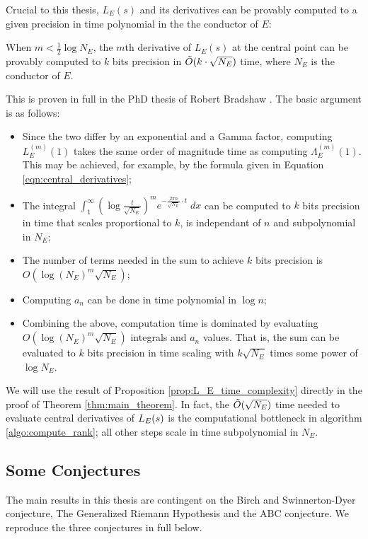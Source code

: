 Crucial to this thesis, $L_E(s)$ and its derivatives can be provably computed to a given precision in time polynomial in the the conductor of $E$:
\begin{proposition}\label{prop:L_E_time_complexity}
When $m<\frac{1}{2} \log N_E$, the $m$th derivative of $L_E(s)$ at the central point can be provably computed to $k$ bits precision in $\tilde{O}(k\cdot \sqrt{N_E})$ time, where $N_E$ is the conductor of $E$.
\end{proposition}
This is proven in full in the PhD thesis of Robert Bradshaw \cite{Bra-2010}. The basic argument is as follows:
\begin{itemize}
\item Since the two differ by an exponential and a Gamma factor, computing $L_E^{(m)}(1)$ takes the same order of magnitude time as computing $\Lambda_E^{(m)}(1)$. This may be achieved, for example, by the formula given in Equation \ref{eqn:central_derivatives};
\item The integral $\int_{1}^{\infty} \left(\log \frac{t}{\sqrt{N_E}}\right)^m e^{-\frac{2\pi n}{\sqrt{N_E}}\cdot t} \; dx$ can be computed to $k$ bits precision in time that scales proportional to $k$, is independant of $n$ and subpolynomial in $N_E$;
\item The number of terms needed in the sum to achieve $k$ bits precision is $O\left( \log(N_E)^m\sqrt{N_E}\right)$;
\item Computing $a_n$ can be done in time polynomial in $\log n$;
\item Combining the above, computation time is dominated by evaluating $O( \log(N_E)^m\sqrt{N_E})$ integrals and $a_n$ values. That is, the sum can be evaluated to $k$ bits precision in time scaling with $k \sqrt{N_E}$ times some power of $\log N_E$.
\end{itemize}
We will use the result of Proposition \ref{prop:L_E_time_complexity} directly in the proof of Theorem \ref{thm:main_theorem}. In fact, the $\tilde{O}(\sqrt{N_E})$ time needed to evaluate central derivatives of $L_E(s)$ is the computational bottleneck in algorithm \ref{algo:compute_rank}; all other steps scale in time subpolynomial in $N_E$. 

\subsection{Some Conjectures}\label{sec:conjectures}

The main results in this thesis are contingent on the Birch and Swinnerton-Dyer conjecture, The Generalized Riemann Hypothesis and the ABC conjecture. We reproduce the three conjectures in full below. \\

